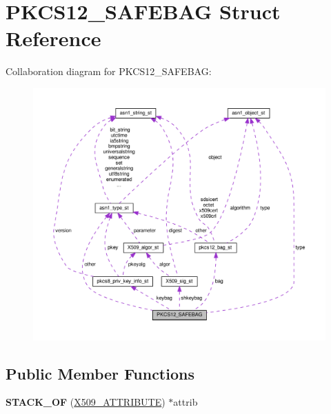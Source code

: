 \hypertarget{structPKCS12__SAFEBAG}{}\section{P\+K\+C\+S12\+\_\+\+S\+A\+F\+E\+B\+AG Struct Reference}
\label{structPKCS12__SAFEBAG}


Collaboration diagram for P\+K\+C\+S12\+\_\+\+S\+A\+F\+E\+B\+AG\+:
\nopagebreak
\begin{figure}[H]
\begin{center}
\leavevmode
\includegraphics[width=350pt]{structPKCS12__SAFEBAG__coll__graph}
\end{center}
\end{figure}
\subsection*{Public Member Functions}
\begin{DoxyCompactItemize}
\item 
\mbox{\label{structPKCS12__SAFEBAG_a6026c2284c1b8dded9083ef57966e88d}} 
{\bfseries S\+T\+A\+C\+K\+\_\+\+OF} (\hyperlink{structx509__attributes__st}{X509\+\_\+\+A\+T\+T\+R\+I\+B\+U\+TE}) $\ast$attrib
\end{DoxyCompactItemize}
